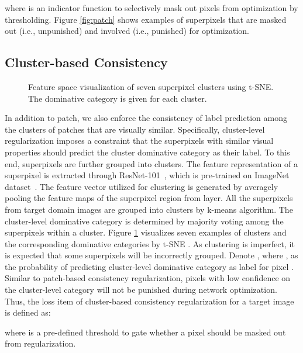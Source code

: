 \documentclass[10pt,twocolumn,letterpaper]{article}
\begin{document}
where  is an indicator function to selectively mask out pixels from optimization by thresholding. Figure \ref{fig:patch} shows examples of superpixels that are masked out (i.e., unpunished) and involved (i.e., punished) for optimization.


\subsection{Cluster-based Consistency}

\begin{figure}[!tb]
   \caption{\small Feature space visualization of seven superpixel clusters using t-SNE. The dominative category is given for each cluster.}
   \label{fig:cluster}
   \vspace{-0.15in}
\end{figure}
In addition to patch, we also enforce the consistency of label prediction among the clusters of patches that are visually similar. Specifically, cluster-level regularization imposes a constraint that the superpixels with similar visual properties should predict the cluster dominative category as their label. To this end, superpixels are further grouped into clusters. The feature representation of a superpixel is extracted through ResNet-101~\cite{he2016deep}, which is pre-trained on ImageNet dataset~\cite{ILSVRC15}. The feature vector utilized for clustering is generated by averagely pooling the feature maps of the superpixel region from  layer.
All the superpixels from target domain images are grouped into  clusters by k-means algorithm. The cluster-level dominative category  is determined by majority voting among the superpixels within a cluster. Figure \ref{fig:cluster} visualizes seven examples of clusters and the corresponding dominative categories by t-SNE \cite{maaten:JMLR08}. As clustering is imperfect, it is expected that some superpixels will be incorrectly grouped. Denote , where , as the probability of predicting cluster-level dominative category as label for pixel . Similar to patch-based consistency regularization, pixels with low confidence on the cluster-level category will not be punished during network optimization. Thus, the loss item of cluster-based consistency regularization for a target image  is defined as:

where  is a pre-defined threshold to gate whether a pixel should be masked out from regularization.
\end{document}
